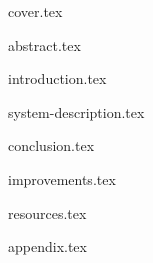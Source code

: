\documentclass{article}
\begin{document}
{cover.tex}

{abstract.tex}

\tableofcontents
\newpage

{introduction.tex}

{system-description.tex}

{conclusion.tex}

{improvements.tex}

{resources.tex}

{appendix.tex}
\end{document}
